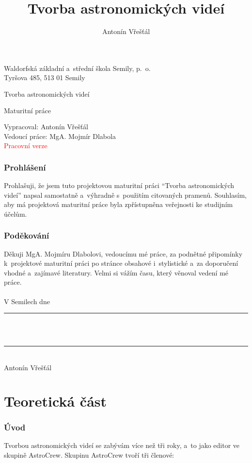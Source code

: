 \documentclass[12pt,a4paper,titlepage]{article}
\author{Antonín Vřešťál}
\title{Tvorba astronomických videí}
\begin{document}
\begin{titlepage}
	\begin{center}
		Waldorfská základní a~střední škola Semily, p.\  o.\\
		Tyršova 485, 513 01 Semily
		\vspace*{1cm}
 
		\vfill		

		\Huge
		Tvorba astronomických videí
 
		\normalsize
		\vspace{0.5cm}
		Maturitní práce 	 
		 
		\vfill		
	\end{center}
	Vypracoval: Antonín Vřešťál\\
	Vedoucí práce: MgA. Mojmír Dlabola\\
	\textcolor{red}{Pracovní verze}\\
 \end{titlepage}
\newpage
\section*{Prohlášení}
Prohlašuji, že jsem tuto projektovou maturitní práci \enquote{Tvorba astronomických videí} napsal samostatně a~výhradně s~použitím citovaných pramenů. Souhlasím, aby má projektová maturitní práce byla zpřístupněna veřejnosti ke studijním účelům.
\section*{Poděkování}
Děkuji MgA. Mojmíru Dlabolovi, vedoucímu mé práce, za podnětné připomínky k~projektové maturitní práci po stránce obsahové i~stylistické a~za doporučení vhodné a~zajímavé literatury. Velmi si vážím času, který věnoval vedení mé práce.\\
\\
V Semilech dne \hspace{0.05cm} \rule[-3pt]{1.5in}{0.5pt}\\
\\
\hspace{0.5cm} \rule[-3pt]{5.5cm}{0.5pt}\\
\indent \indent Antonín Vřešťál\\

\newpage
\tableofcontents
\newpage
\part{Teoretická část}
\section{Úvod}
Tvorbou astronomických videí se zabývám více než tři roky, a~to jako editor ve skupině AstroCrew. Skupinu AstroCrew tvoří tři členové:
\end{document}
